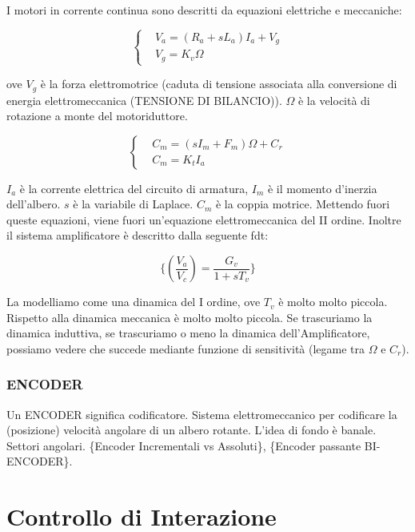 I motori in corrente continua sono descritti da equazioni elettriche e meccaniche:

\[
	\left\{
	\begin{aligned}
	&V_a = (R_a+sL_a)I_a+V_g\\
	&V_g=K_v\Omega
	\end{aligned}
	\right.
\]

ove $V_g$ è la forza elettromotrice (caduta di tensione associata alla conversione di energia elettromeccanica (TENSIONE DI BILANCIO)). $\Omega$ è la velocità di rotazione a monte del motoriduttore.

\[
	\left\{
	\begin{aligned}
	&C_m=(sI_m + F_m)\Omega+C_r\\
	&C_m=K_tI_a
	\end{aligned}
	\right.
\]

$I_a$ è la corrente elettrica del circuito di armatura, $I_m$ è il momento d'inerzia dell'albero. $s$ è la variabile di Laplace. $C_m$ è la coppia motrice. Mettendo fuori queste equazioni, viene fuori un'equazione elettromeccanica del II ordine. Inoltre il sistema amplificatore è descritto dalla seguente fdt:

\[
	\{(\frac{V_a}{V_c}) = \frac{G_v}{1+sT_v}\}
\]

La modelliamo come una dinamica del I ordine, ove $T_v$ è molto molto piccola. Rispetto alla dinamica meccanica è molto molto piccola. Se trascuriamo la dinamica induttiva, se trascuriamo o meno la dinamica dell'Amplificatore, possiamo vedere che succede mediante funzione di sensitività (legame tra $\Omega$ e $C_r$).

\subsubsection{ENCODER}

Un ENCODER significa codificatore. Sistema elettromeccanico per codificare la (posizione) velocità angolare di un albero rotante. L'idea di fondo è banale. Settori angolari. \{Encoder Incrementali vs Assoluti\}, \{Encoder passante BI-ENCODER\}.


\section{Controllo di Interazione}

